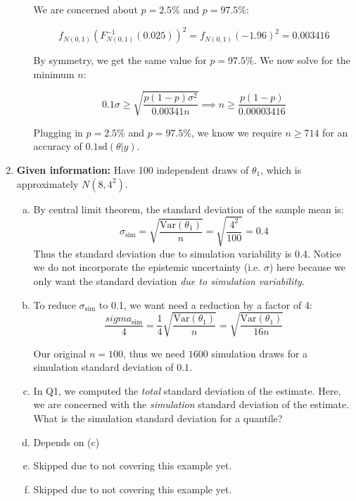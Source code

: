 \documentclass[12pt]{article}
\begin{document}
\begin{enumerate}[1.]
\begin{enumerate}[(a)]
We are concerned about $p=2.5\%$ and $p=97.5\%$:

$$f_{N(0, 1)}(F_{N(0, 1)}^{-1}(0.025))^2 = f_{N(0, 1)}(-1.96)^2 = 0.003416 $$

By symmetry, we get the same value for $p=97.5\%$.
We now solve for the minimum $n$:

$$0.1\sigma \ge \sqrt{\frac{p(1-p)\sigma^2}{0.00341n}} \implies n \ge \frac{p(1-p)}{0.00003416}$$

Plugging in $p=2.5\%$ and $p=97.5\%$, we know we require $n \ge 714$ for an accuracy of $0.1 \text{sd}(\theta|y)$.
\end{enumerate}

\newpage

\item \textbf{Given information:} Have 100 independent draws of $\theta_1$, which is approximately $N(8, 4^2)$.
\begin{enumerate}[(a)]
\item By central limit theorem, the standard deviation of the sample mean is:
$$\sigma_{\text{sim}} = \sqrt{\frac{\mathrm{Var}(\theta_1)}{n}} = \sqrt{\frac{4^2}{100}} = 0.4$$
Thus the standard deviation due to simulation variability is 0.4.
Notice we do not incorporate the epistemic uncertainty (i.e. $\sigma$) here because we only want the standard deviation \textit{due to simulation variability}.

\item To reduce $\sigma_{\text{sim}}$ to 0.1, we want need a reduction by a factor of 4:
$$\frac{sigma_{\text{sim}}}{4} = \frac{1}{4}\sqrt{\frac{\mathrm{Var}(\theta_1)}{n}} = \sqrt{\frac{\mathrm{Var}(\theta_1)}{16 n}}$$

Our original $n=100$, thus we need $1600$ simulation draws for a simulation standard deviation of $0.1$.

\item In Q1, we computed the \textit{total} standard deviation of the estimate. 
Here, we are concerned with the \textit{simulation} standard deviation of the estimate. 
What is the simulation standard deviation for a quantile?

\item Depends on (c)
\item Skipped due to not covering this example yet.
\item Skipped due to not covering this example yet.
\end{enumerate}
\end{enumerate}
\end{document}
